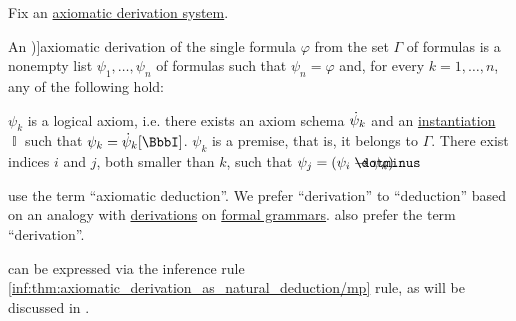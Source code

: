 \begin{definition}\label{def:axiomatic_derivation}
  Fix an \hyperref[def:axiomatic_derivation_system]{axiomatic derivation system}.

  An \term[ru=вывод (\cite[35]{Герасимов2011Вычислимость})]{axiomatic derivation} of the single formula \( \varphi \) from the set \( \Gamma \) of formulas is a nonempty list \( \psi_1, \ldots, \psi_n \) of formulas such that \( \psi_n = \varphi \) and, for every \( k = 1, \ldots, n \), any of the following hold:
  \begin{thmenum}
     \( \psi_k \) is a logical axiom, i.e. there exists an axiom schema \( \dot{\psi}_k \) and an \hyperref[def:propositional_schema_instantiation]{instantiation} \( \BbbI \) such that \( \psi_k = \syn\psi_k[\BbbI] \).
     \( \psi_k \) is a premise, that is, it belongs to \( \Gamma \).
     There exist indices \( i \) and \( j \), both smaller than \( k \), such that \( \psi_j = (\psi_i \synimplies \psi_k) \).
  \end{thmenum}
\end{definition}
\begin{comments}
  \item {} use the term \enquote{axiomatic deduction}. We prefer \enquote{derivation} to \enquote{deduction} based on an analogy with \hyperref[def:formal_grammar/derivation]{derivations} on \hyperref[def:formal_grammar]{formal grammars}.  also prefer the term \enquote{derivation}.

  \item {} can be expressed via the inference rule \ref{inf:thm:axiomatic_derivation_as_natural_deduction/mp} rule, as will be discussed in .
\end{comments}

